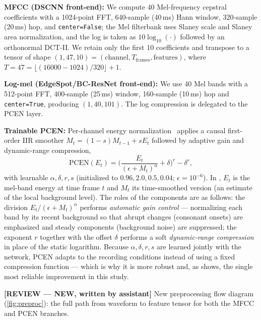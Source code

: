 \documentclass[12pt,a4paper]{report}
\newcommand{\reviewnote}[1]{%
    \par\smallskip\noindent
    \colorbox{yellow!35}{\parbox{0.97\linewidth}{\small\textbf{[REVIEW — NEW, written by assistant]}\; #1}}%
    \par\smallskip}
\newcommand{\reviewnote}[1]{}
\newcommand{\code}[1]{\texttt{\small #1}}
\begin{document}
\textbf{MFCC (DSCNN front-end):} We compute 40 Mel-frequency cepstral
coefficients with a 1024-point FFT, 640-sample (40\,ms) Hann window, 320-sample
(20\,ms) hop, and \code{center=False}; the Mel filterbank uses Slaney scale and
Slaney area normalization, and the log is taken as $10\log_{10}(\cdot)$ followed
by an orthonormal DCT-II. We retain only the first 10 coefficients and transpose
to a tensor of shape $(1,47,10)=(\text{channel}, T_{\text{frames}},
\text{features})$, where $T = 47 = \lfloor(16000-1024)/320\rfloor + 1$.

\textbf{Log-mel (EdgeSpot/BC-ResNet front-end):} We use 40 Mel bands with a
512-point FFT, 400-sample (25\,ms) window, 160-sample (10\,ms) hop and
\code{center=True}, producing $(1,40,101)$. The log compression is delegated to
the PCEN layer.

\textbf{Trainable PCEN:} Per-channel energy normalization~\cite{wang2017trainable}
applies a causal first-order IIR smoother $M_t = (1-s)M_{t-1} + sE_t$ followed by
adaptive gain and dynamic-range compression,
\begin{equation}
\text{PCEN}(E_t)=\Big(\frac{E_t}{(\epsilon+M_t)^{\alpha}}+\delta\Big)^{r}-\delta^{r},
\label{eq:pcen}
\end{equation}
with learnable $\alpha,\delta,r,s$ (initialized to $0.96, 2.0, 0.5, 0.04$;
$\epsilon{=}10^{-6}$). In , $E_t$ is the mel-band energy at time
frame $t$ and $M_t$ its time-smoothed version (an estimate of the local background
level). The roles of the components are as follows: the division
$E_t/(\epsilon+M_t)^{\alpha}$ performs \emph{automatic gain control} ---
normalizing each band by its recent background so that abrupt changes (consonant
onsets) are emphasized and steady components (background noise) are suppressed; the
exponent $r$ together with the offset $\delta$ performs a soft \emph{dynamic-range
compression} in place of the static logarithm. Because $\alpha,\delta,r,s$ are
learned jointly with the network, PCEN adapts to the recording conditions instead
of using a fixed compression function --- which is why it is more robust and, as
 shows, the single most reliable improvement in this study.

\reviewnote{New preprocessing flow diagram (\ref{fig:preproc}): the full path from
waveform to feature tensor for both the MFCC and PCEN branches.}
\end{document}
